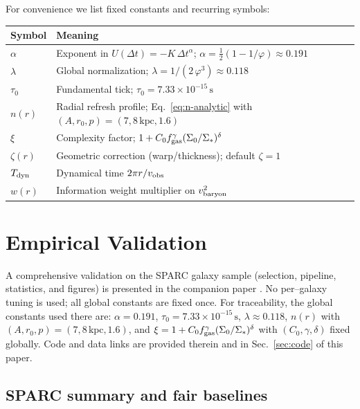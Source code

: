 \documentclass[twocolumn,prd,amsmath,amssymb,aps,superscriptaddress,nofootinbib]{revtex4-2}
\begin{document}
For convenience we list fixed constants and recurring symbols:
\begin{center}
\begin{tabular}{ll}
\toprule
Symbol & Meaning \\
\midrule
$\alpha$ & Exponent in $U(\Delta t)=-K\,\Delta t^{\alpha}$; $\alpha=\tfrac12(1-1/\varphi)\approx0.191$ \\
$\lambda$ & Global normalization; $\lambda=1/(2\,\varphi^3)\approx0.118$ \\
$\tau_0$ & Fundamental tick; $\tau_0=7.33\times10^{-15}\,\mathrm{s}$ \\
$n(r)$ & Radial refresh profile; Eq.~\ref{eq:n-analytic} with $(A,r_0,p)=(7,8\,\mathrm{kpc},1.6)$ \\
$\xi$ & Complexity factor; $1+C_0 f_{\rm gas}^{\gamma}(\Sigma_0/\Sigma_*)^{\delta}$ \\
$\zeta(r)$ & Geometric correction (warp/thickness); default $\zeta=1$ \\
$T_{\rm dyn}$ & Dynamical time $2\pi r/v_{\rm obs}$ \\
$w(r)$ & Information weight multiplier on $v_{\rm baryon}^2$ \\
\bottomrule
\end{tabular}
\end{center}

\section{Empirical Validation}

A comprehensive validation on the SPARC galaxy sample (selection, pipeline, statistics, and figures) is presented in the companion paper \cite{Washburn2025a}. No per–galaxy tuning is used; all global constants are fixed once. For traceability, the global constants used there are: $\alpha=0.191$, $\tau_0=7.33\times10^{-15}\,\mathrm{s}$, $\lambda \approx 0.118$, $n(r)$ with $(A, r_0, p)=(7,8\,\mathrm{kpc},1.6)$, and $\xi=1 + C_0 f_{\rm gas}^{\gamma}(\Sigma_0/\Sigma_*)^{\delta}$ with $(C_0,\gamma,\delta)$ fixed globally. Code and data links are provided therein and in Sec.~\ref{sec:code} of this paper.

\subsection{SPARC summary and fair baselines}
\label{sec:sparc-summary}
\end{document}
